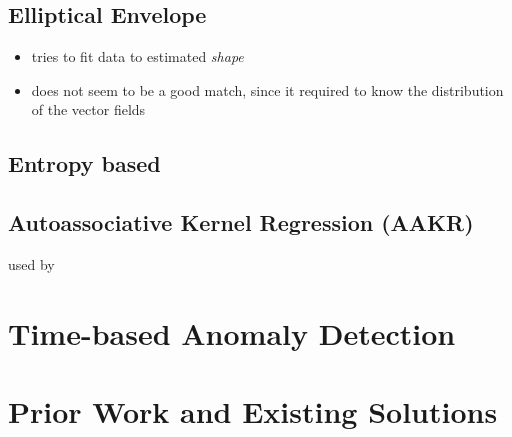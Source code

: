 	\subsection{Elliptical Envelope}
	\label{sec:background:network:novelty:envelope}
	
	\begin{itemize}
		\item tries to fit data to estimated \emph{shape}
		\item does not seem to be a good match, since it required to know the distribution of the vector fields
	\end{itemize}

	

	\subsection{Entropy based}
	\subsection{Autoassociative Kernel Regression (AAKR)}
		used by \textcite{Yang2006}

\section{Time-based Anomaly Detection}

\section{Prior Work and Existing Solutions}
\label{sec:background:network:priorwork}


